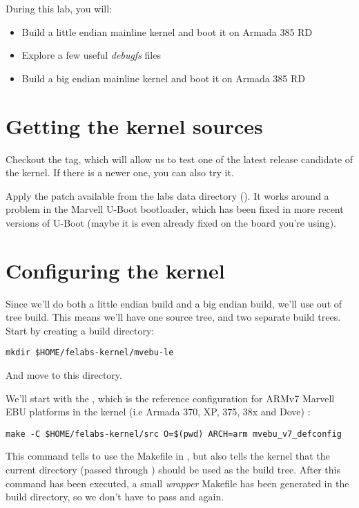 
During this lab, you will:

\begin{itemize}
\item Build a little endian mainline kernel and boot it on Armada 385 RD
\item Explore a few useful {\em debugfs} files
\item Build a big endian mainline kernel and boot it on Armada 385 RD
\end{itemize}

\section{Getting the kernel sources}

Checkout the  tag, which will allow us to test one of
the latest release candidate of the kernel. If there is a newer one,
you can also try it.

Apply the  patch available from the labs data
directory (). It works around
a problem in the Marvell U-Boot bootloader, which has been fixed in
more recent versions of U-Boot (maybe it is even already fixed on the
board you're using).

\section{Configuring the kernel}

Since we'll do both a little endian build and a big endian build,
we'll use out of tree build. This means we'll have one source tree,
and two separate build trees. Start by creating a build directory:

\begin{verbatim}
mkdir $HOME/felabs-kernel/mvebu-le
\end{verbatim}

And move to this directory.

We'll start with the , which is the reference
configuration for ARMv7 Marvell EBU platforms in the kernel (i.e
Armada 370, XP, 375, 38x and Dove) :

\begin{verbatim}
make -C $HOME/felabs-kernel/src O=$(pwd) ARCH=arm mvebu_v7_defconfig
\end{verbatim}

This command tells  to use the Makefile in
, but also tells the kernel that the
current directory (passed through ) should be used as the
build tree. After this command has been executed, a small {\em
  wrapper} Makefile has been generated in the build directory, so we
don't have to pass  and  again.

